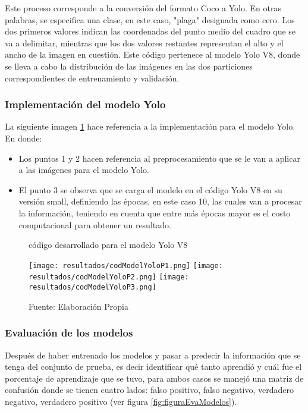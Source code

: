 \newpage

Este proceso corresponde a la conversión del formato Coco a Yolo. En otras palabras, se especifica una clase, en este caso, "plaga" designada como cero. Los dos primeros valores indican las coordenadas del punto medio del cuadro que se va a delimitar, mientras que los dos valores restantes representan el alto y el ancho de la imagen en cuestión. Este código pertenece al modelo Yolo V8, donde se lleva a cabo la distribución de las imágenes en las dos particiones correspondientes de entrenamiento y validación.


\subsubsection{Implementación del modelo Yolo}

La siguiente imagen \ref{fig:figuraCodModelYolo} hace referencia a la implementación para el modelo Yolo. En donde:

\begin{itemize}
    \item Los puntos 1 y 2 hacen referencia al preprocesamiento que se le van a aplicar a las imágenes para el modelo Yolo.
    \item El punto 3 se observa que se carga el modelo en el código Yolo V8 en su versión small, definiendo las épocas, en este caso 10, las cuales van a procesar la información, teniendo en cuenta que entre más épocas mayor es el costo computacional para obtener un resultado. 
\end{itemize}

\newpage

\begin{figure}[h]
\centering
\caption{código desarrollado para el modelo Yolo V8}
\texttt{[image: resultados/codModelYoloP1.png]}
\texttt{[image: resultados/codModelYoloP2.png]}
\texttt{[image: resultados/codModelYoloP3.png]}
\caption*{\footnotesize Fuente: Elaboración Propia}
\label{fig:figuraCodModelYolo}
\end{figure}

\subsubsection{Evaluación de los modelos}

Después de haber entrenado los modelos y pasar a predecir la información que se tenga del  conjunto de prueba, es decir identificar qué tanto aprendió y cuál fue el porcentaje de aprendizaje que se tuvo, para ambos casos se manejó una matriz de confusión donde se tienen cuatro lados: falso positivo, falso negativo, verdadero negativo, verdadero positivo (ver figura \ref{fig:figuraEvaModelos}).

